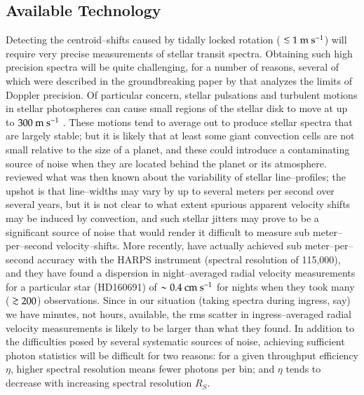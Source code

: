 \subsection{Available Technology}
\label{rot_ssec:tech}
Detecting the centroid--shifts caused by tidally locked rotation
($\lsim 1 {\rm ~m~s^{-1}}$) will require very precise measurements of
stellar transit spectra.  Obtaining such high precision spectra will
be quite challenging, for a number of reasons, several of which were
described in the groundbreaking paper by \citet{butler_et_al1996} that
analyzes the limits of Doppler precision.  Of particular concern,
stellar pulsations and turbulent motions in stellar photospheres can
cause small regions of the stellar disk to move at up to $300 {\rm
~m~s^{-1}}$ \citep{dravins1985, ulrich1991}.  These motions tend to
average out to produce stellar spectra that are largely stable; but it
is likely that at least some giant convection cells are not small
relative to the size of a planet, and these could introduce a
contaminating source of noise when they are located behind the planet
or its atmosphere.  \citet{butler_et_al1996} reviewed what was then
known about the variability of stellar line--profiles; the upshot is
that line--widths may vary by up to several meters per second over
several years, but it is not clear to what extent spurious apparent
velocity shifts may be induced by convection, and such stellar jitters
may prove to be a significant source of noise that would render it
difficult to measure sub meter--per--second velocity--shifts.  More
recently, \citet{bouchy_et_al2005b} have actually achieved sub
meter--per--second accuracy with the HARPS instrument (spectral
resolution of 115,000), and they have found a dispersion in
night--averaged radial velocity measurements for a particular star
(HD160691) of $\sim 0.4 {\rm ~cm~s^{-1}}$ for nights when they took
many ($\gsim 200$) observations.  Since in our situation (taking
spectra during ingress, say) we have minutes, not hours, available,
the rms scatter in ingress--averaged radial velocity measurements is
likely to be larger than what they found.  In addition to the
difficulties posed by several systematic sources of noise, achieving
sufficient photon statistics will be difficult for two reasons: for a
given throughput efficiency $\eta$, higher spectral resolution means
fewer photons per bin; and $\eta$ tends to decrease with increasing
spectral resolution $R_S$.

